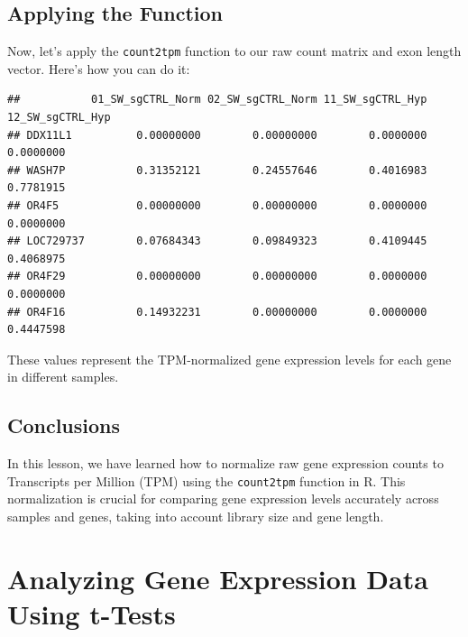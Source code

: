 \documentclass[
]{book}
\newenvironment{Shaded}{\begin{snugshade}}{\end{snugshade}}
\newcommand{\FunctionTok}[1]{\textcolor[rgb]{0.13,0.29,0.53}{\textbf{#1}}}
\newcommand{\NormalTok}[1]{#1}
\newcommand{\OtherTok}[1]{\textcolor[rgb]{0.56,0.35,0.01}{#1}}
\newcommand{\SpecialCharTok}[1]{\textcolor[rgb]{0.81,0.36,0.00}{\textbf{#1}}}
\begin{document}
\hypertarget{applying-the-function}{%
\subsection{Applying the Function}\label{applying-the-function}}

Now, let's apply the \texttt{count2tpm} function to our raw count matrix and exon length vector. Here's how you can do it:

\begin{Shaded}
\end{Shaded}

\begin{verbatim}
##           01_SW_sgCTRL_Norm 02_SW_sgCTRL_Norm 11_SW_sgCTRL_Hyp 12_SW_sgCTRL_Hyp
## DDX11L1          0.00000000        0.00000000        0.0000000        0.0000000
## WASH7P           0.31352121        0.24557646        0.4016983        0.7781915
## OR4F5            0.00000000        0.00000000        0.0000000        0.0000000
## LOC729737        0.07684343        0.09849323        0.4109445        0.4068975
## OR4F29           0.00000000        0.00000000        0.0000000        0.0000000
## OR4F16           0.14932231        0.00000000        0.0000000        0.4447598
\end{verbatim}

These values represent the TPM-normalized gene expression levels for each gene in different samples.

\hypertarget{conclusions-1}{%
\subsection{Conclusions}\label{conclusions-1}}

In this lesson, we have learned how to normalize raw gene expression counts to Transcripts per Million (TPM) using the \texttt{count2tpm} function in R. This normalization is crucial for comparing gene expression levels accurately across samples and genes, taking into account library size and gene length.

\hypertarget{analyzing-gene-expression-data-using-t-tests}{%
\section{Analyzing Gene Expression Data Using t-Tests}\label{analyzing-gene-expression-data-using-t-tests}}
\end{document}

